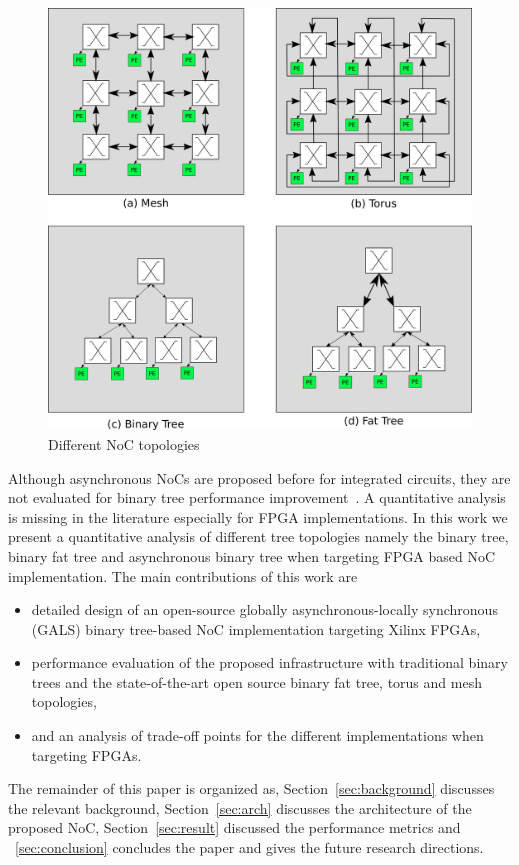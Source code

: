 \begin{figure}[t]
\centering
   \includegraphics[width=\columnwidth]{Figures/topologies.pdf}
   \caption{Different NoC topologies}
   \label{fig:topologies}
\end{figure}


Although asynchronous NoCs are proposed before for integrated circuits, they are not evaluated for binary tree performance improvement~\cite{Bjerregaard2005, USP2011,Miro2007}. A quantitative analysis is missing in the literature especially for FPGA implementations.
In this work we present a quantitative analysis of different tree topologies namely the binary tree, binary fat tree and asynchronous binary tree when targeting FPGA based NoC implementation. 
The main contributions of this work are
\begin{itemize}
\item detailed design of an open-source globally asynchronous-locally synchronous (GALS) binary tree-based NoC implementation targeting Xilinx FPGAs,
\item performance evaluation of the proposed infrastructure with traditional binary trees and the state-of-the-art open source binary fat tree, torus and mesh topologies,
\item and an analysis of trade-off points for the different implementations when targeting FPGAs.
\end{itemize}
The remainder of this paper is organized as, Section~\ref{sec:background} discusses the relevant background, Section~\ref{sec:arch} discusses the architecture of the proposed NoC, Section~\ref{sec:result} discussed the performance metrics and ~\ref{sec:conclusion} concludes the paper and gives the future research directions.